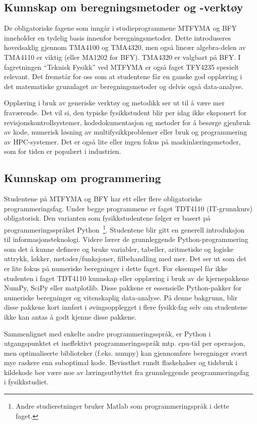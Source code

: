 \documentclass{article}
\begin{document}
\subsection{Kunnskap om beregningsmetoder og -verktøy}
De obligatoriske fagene som inngår i studieprogrammene MTFYMA og BFY inneholder en tydelig basis innenfor beregningsmetoder. Dette introduseres hovedsaklig gjennom TMA4100 og TMA4320, men også lineær algebra-delen av TMA4110 er viktig (eller MA1202 for BFY). TMA4320 er valgbart på BFY. I fagretningen ``Teknisk Fysikk'' ved MTFYMA er også faget TFY4235 spesielt relevant. Det fremstår for oss som at studentene får en ganske god opplæring i det matematiske grunnlaget av beregningsmetoder og delvis også data-analyse.

Opplæring i bruk av generiske verktøy og metodikk ser ut til å være mer fraværende. Det vil si, den typiske fysikkstudent blir per idag ikke eksponert for revisjonskontrollsystemer, kodedokumentasjon og metoder for å besørge gjenbruk av kode, numerisk løsning av multifysikkproblemer eller bruk og programmering av HPC-systemer. Det er også lite eller ingen fokus på maskinlæringsmetoder, som for tiden er populært i industrien.

\subsection{Kunnskap om programmering}
\label{Sec:Programming}
Studentene på MTFYMA og BFY har ett eller flere obligatoriske programmeringsfag. Under begge programmene er faget TDT4110 (IT-grunnkurs) obligatorisk. Den varianten som fysikkstudentene følger er basert på programmeringsspråket Python~\footnote{Andre studieretninger bruker Matlab som programmeringspråk i dette faget.}. Studentene blir gitt en generell introduksjon til informasjonsteknologi. Videre lærer de grunnleggende Python-programmering som det å kunne definere og bruke variabler, tabeller, aritmetiske og logiske uttrykk, løkker, metoder/funksjoner, filbehandling med mer. Det ser ut som det er lite fokus på numeriske beregninger i dette faget. For eksempel får ikke studenten i faget TDT4110 kunnskap eller opplæring i bruk av de kjernepakkene NumPy, SciPy eller matplotlib. Disse pakkene er essensielle Python-pakker for numeriske beregninger og vitenskaplig data-analyse. På denne bakgrunn, blir disse pakkene kort innført i øvingsopplegget i flere fysikk-fag selv om studentene ikke kan antas å godt kjenne disse pakkene. 

{\color{red} Sammenlignet med enkelte andre programmeringsspråk, er Python i utgangspunktet et ineffektivt programmeringsspråk mtp. cpu-tid per operasjon, men optimaliserte biblioteker (f.eks. numpy) kan gjennomføre beregninger svært mye raskere enn suboptimal kode.
Bevissthet rundt flaskehalser og tidsbruk i kildekode bør være noe av læringsutbyttet fra grunnleggende programmeringsfag i fysikkstudiet.}
\end{document}
